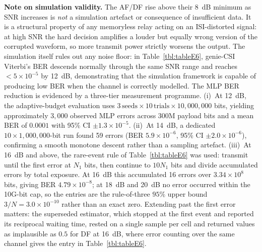 \textbf{Note on simulation validity.}
The AF/DF rise above their 8~dB minimum as SNR increases is \emph{not} a simulation artefact or consequence of insufficient data. It is a structural property of any memoryless relay acting on an ISI-distorted signal: at high SNR the hard decision amplifies a louder but equally wrong version of the corrupted waveform, so more transmit power strictly worsens the output. The simulation itself rules out any noise floor: in Table~\ref{tbl:tableE6}, genie-CSI Viterbi's BER descends normally through the same SNR range and reaches $<5\times10^{-5}$ by 12~dB, demonstrating that the simulation framework is capable of producing low BER when the channel is correctly modelled. The MLP BER reduction is evidenced by a three-tier measurement programme. (i)~At 12~dB, the adaptive-budget evaluation uses $3\,\text{seeds}\times10\,\text{trials}\times10{,}000{,}000$ bits, yielding approximately $3{,}000$ observed MLP errors across 300M payload bits and a mean BER of $0.0001$ with 95\% CI ${\pm}1.3\times10^{-5}$. (ii)~At 14~dB, a dedicated $10\times1{,}000{,}000$-bit run found 59 errors (BER $5.9\times10^{-6}$, 95\% CI ${\pm}2.0\times10^{-6}$), confirming a smooth monotone descent rather than a sampling artefact. (iii)~At 16~dB and above, the rare-event rule of Table~\ref{tbl:tableE6} was used: transmit until the first error at $N_1$ bits, then continue to $10N_1$ bits and divide accumulated errors by total exposure. At 16~dB this accumulated 16 errors over $3.34\times10^{8}$ bits, giving BER $4.79\times10^{-8}$; at 18~dB and 20~dB no error occurred within the 10G-bit cap, so the entries are the rule-of-three $95\%$ upper bound $3/N = 3.0\times10^{-10}$ rather than an exact zero. Extending past the first error matters: the superseded estimator, which stopped at the first event and reported its reciprocal waiting time, rested on a single sample per cell and returned values as implausible as $0.5$ for DF at 16~dB, where error counting over the same channel gives the entry in Table~\ref{tbl:tableE6}.


